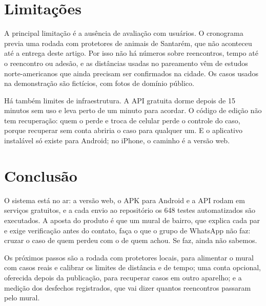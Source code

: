 \documentclass[12pt]{article}
\newcommand{\testesTotal}{648}
\begin{document}
\section{Limitações}
\label{sec:limitacoes}

A principal limitação é a ausência de avaliação com usuários. O cronograma previa
uma rodada com protetores de animais de Santarém, que não aconteceu até a entrega
deste artigo. Por isso não há números sobre reencontros, tempo até o reencontro ou
adesão, e as distâncias usadas no pareamento vêm de estudos norte-americanos
\cite{kremer2021,huang2018} que ainda precisam ser confirmados na cidade. Os casos
usados na demonstração são fictícios, com fotos de domínio público.

Há também limites de infraestrutura. A API gratuita dorme depois de 15 minutos sem
uso e leva perto de um minuto para acordar. O código de edição não tem
recuperação: quem o perde e troca de celular perde o controle do caso, porque
recuperar sem conta abriria o caso para qualquer um. E o aplicativo instalável só
existe para Android; no iPhone, o caminho é a versão web.

\section{Conclusão}

O sistema está no ar: a versão web, o APK para Android e a API rodam em serviços
gratuitos, e a cada envio ao repositório os \testesTotal{} testes automatizados
são executados. A aposta do produto é que um mural de bairro, que explica cada par e
exige verificação antes do contato, faça o que o grupo de WhatsApp não faz:
cruzar o caso de quem perdeu com o de quem achou. Se faz, ainda não sabemos.

Os próximos passos são a rodada com protetores locais, para alimentar o mural com
casos reais e calibrar os limites de distância e de tempo; uma conta opcional,
oferecida depois da publicação, para recuperar casos em outro aparelho; e a
medição dos desfechos registrados, que vai dizer quantos reencontros passaram
pelo mural.



\end{document}
